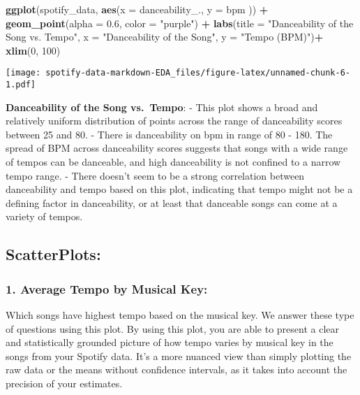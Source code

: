\documentclass[
]{article}
\newenvironment{Shaded}{\begin{snugshade}}{\end{snugshade}}
\newcommand{\AttributeTok}[1]{\textcolor[rgb]{0.13,0.29,0.53}{#1}}
\newcommand{\DecValTok}[1]{\textcolor[rgb]{0.00,0.00,0.81}{#1}}
\newcommand{\FloatTok}[1]{\textcolor[rgb]{0.00,0.00,0.81}{#1}}
\newcommand{\FunctionTok}[1]{\textcolor[rgb]{0.13,0.29,0.53}{\textbf{#1}}}
\newcommand{\NormalTok}[1]{#1}
\newcommand{\SpecialCharTok}[1]{\textcolor[rgb]{0.81,0.36,0.00}{\textbf{#1}}}
\newcommand{\StringTok}[1]{\textcolor[rgb]{0.31,0.60,0.02}{#1}}
\begin{document}
\begin{Shaded}
\begin{Highlighting}[]
\FunctionTok{ggplot}\NormalTok{(spotify\_data, }\FunctionTok{aes}\NormalTok{(}\AttributeTok{x =}\NormalTok{ danceability\_., }\AttributeTok{y =}\NormalTok{ bpm )) }\SpecialCharTok{+}
  \FunctionTok{geom\_point}\NormalTok{(}\AttributeTok{alpha =} \FloatTok{0.6}\NormalTok{, }\AttributeTok{color =} \StringTok{"purple"}\NormalTok{) }\SpecialCharTok{+}
  \FunctionTok{labs}\NormalTok{(}\AttributeTok{title =} \StringTok{"Danceability of the Song vs. Tempo"}\NormalTok{,}
       \AttributeTok{x =} \StringTok{"Danceability of the Song"}\NormalTok{,}
       \AttributeTok{y =} \StringTok{"Tempo (BPM)"}\NormalTok{)}\SpecialCharTok{+}
  \FunctionTok{xlim}\NormalTok{(}\DecValTok{0}\NormalTok{, }\DecValTok{100}\NormalTok{) }
\end{Highlighting}
\end{Shaded}

\texttt{[image: spotify-data-markdown-EDA\_files/figure-latex/unnamed-chunk-6-1.pdf]}

\textbf{Danceability of the Song vs.~Tempo}: - This plot shows a broad
and relatively uniform distribution of points across the range of
danceability scores between 25 and 80. - There is danceability on bpm in
range of 80 - 180. The spread of BPM across danceability scores suggests
that songs with a wide range of tempos can be danceable, and high
danceability is not confined to a narrow tempo range. - There doesn't
seem to be a strong correlation between danceability and tempo based on
this plot, indicating that tempo might not be a defining factor in
danceability, or at least that danceable songs can come at a variety of
tempos.

\hypertarget{scatterplots-1}{%
\subsection{ScatterPlots:}\label{scatterplots-1}}

\hypertarget{average-tempo-by-musical-key}{%
\subsubsection{1. Average Tempo by Musical
Key:}\label{average-tempo-by-musical-key}}

Which songs have highest tempo based on the musical key. We answer these
type of questions using this plot. By using this plot, you are able to
present a clear and statistically grounded picture of how tempo varies
by musical key in the songs from your Spotify data. It's a more nuanced
view than simply plotting the raw data or the means without confidence
intervals, as it takes into account the precision of your estimates.
\end{document}
